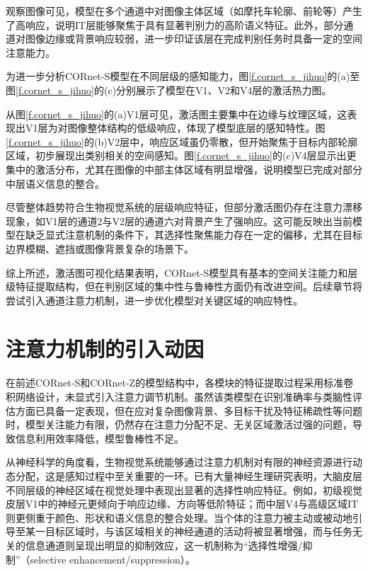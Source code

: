 观察图像可见，模型在多个通道中对图像主体区域（如摩托车轮廓、前轮等）产生了高响应，说明IT层能够聚焦于具有显著判别力的高阶语义特征。此外，部分通道对图像边缘或背景响应较弱，进一步印证该层在完成判别任务时具备一定的空间注意能力。

为进一步分析CORnet-S模型在不同层级的感知能力，图\ref{f.cornet_s_jihuo}的(a)至图\ref{f.cornet_s_jihuo}的(c)分别展示了模型在V1、V2和V4层的激活热力图。

从图\ref{f.cornet_s_jihuo}的(a)V1层可见，激活图主要集中在边缘与纹理区域，这表现出V1层为对图像整体结构的低级响应，体现了模型底层的感知特性。图\ref{f.cornet_s_jihuo}的(b)V2层中，响应区域虽仍零散，但开始聚焦于目标内部轮廓区域，初步展现出类别相关的空间感知。图\ref{f.cornet_s_jihuo}的(c)V4层显示出更集中的激活分布，尤其在图像的中部主体区域有明显增强，说明模型已完成对部分中层语义信息的整合。

尽管整体趋势符合生物视觉系统的层级响应特征，但部分激活图仍存在注意力漂移现象，如V1层的通道2与V2层的通道六对背景产生了强响应。这可能反映出当前模型在缺乏显式注意机制的条件下，其选择性聚焦能力存在一定的偏移，尤其在目标边界模糊、遮挡或图像背景复杂的场景下。

综上所述，激活图可视化结果表明，CORnet-S模型具有基本的空间关注能力和层级特征提取结构，但在判别区域的集中性与鲁棒性方面仍有改进空间。后续章节将尝试引入通道注意力机制，进一步优化模型对关键区域的响应特性。

\section{注意力机制的引入动因}

在前述CORnet-S和CORnet-Z的模型结构中，各模块的特征提取过程采用标准卷积网络设计，未显式引入注意力调节机制。虽然该类模型在识别准确率与类脑性评估方面已具备一定表现，但在应对复杂图像背景、多目标干扰及特征稀疏性等问题时，模型关注能力有限，仍然存在注意力分配不足、无关区域激活过强的问题，导致信息利用效率降低，模型鲁棒性不足。

从神经科学的角度看，生物视觉系统能够通过注意力机制对有限的神经资源进行动态分配，这是感知过程中至关重要的一环。已有大量神经生理研究表明，大脑皮层不同层级的神经区域在视觉处理中表现出显著的选择性响应特征。例如，初级视觉皮层V1中的神经元更倾向于响应边缘、方向等低阶特征；而中层V4与高级区域IT则更侧重于颜色、形状和语义信息的整合处理。当个体的注意力被主动或被动地引导至某一目标区域时，与该区域相关的神经通道的活动将被显著增强，而与任务无关的信息通道则呈现出明显的抑制效应，这一机制称为“选择性增强/抑制”（selective enhancement/suppression）\cite{dicarlo2012does}。

